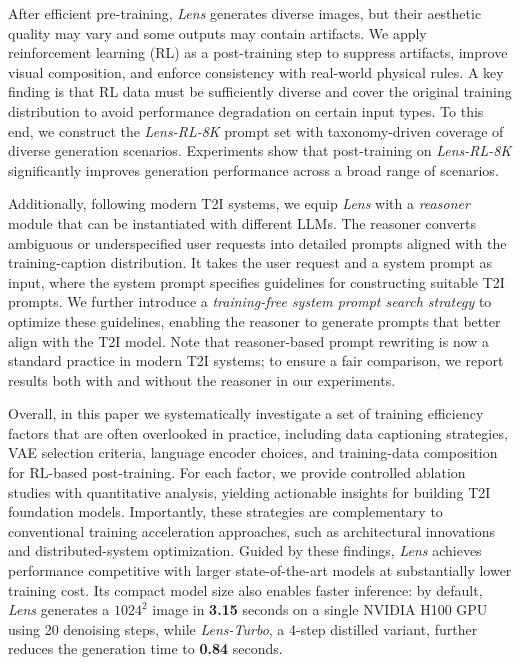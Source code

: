 After efficient pre-training, \textit{Lens} generates diverse images, but their aesthetic quality may vary and some outputs may contain artifacts. We apply reinforcement learning (RL) as a post-training step to suppress artifacts, improve visual composition, and enforce consistency with real-world physical rules. A key finding is that RL data must be sufficiently diverse and cover the original training distribution to avoid performance degradation on certain input types. To this end, we construct the \textit{Lens-RL-8K} prompt set with taxonomy-driven coverage of diverse generation scenarios. Experiments show that post-training on \textit{Lens-RL-8K} significantly improves generation performance across a broad range of scenarios.



Additionally, following modern T2I systems, we equip \textit{Lens} with a \textit{reasoner} module that can be instantiated with different LLMs. The reasoner converts ambiguous or underspecified user requests into detailed prompts aligned with the training-caption distribution. It takes the user request and a system prompt as input, where the system prompt specifies guidelines for constructing suitable T2I prompts. We further introduce a \textit{training-free system prompt search strategy} to optimize these guidelines, enabling the reasoner to generate prompts that better align with the T2I model. Note that reasoner-based prompt rewriting is now a standard practice in modern T2I systems; to ensure a fair comparison, we report results both with and without the reasoner in our experiments.

Overall, in this paper we systematically investigate a set of training efficiency factors that are often overlooked in practice, including data captioning strategies, VAE selection criteria, language encoder choices, and training-data composition for RL-based post-training. For each factor, we provide controlled ablation studies with quantitative analysis, yielding actionable insights for building T2I foundation models. Importantly, these strategies are complementary to conventional training acceleration approaches, such as architectural innovations and distributed-system optimization. Guided by these findings, \textit{Lens} achieves performance competitive with larger state-of-the-art models at substantially lower training cost. Its compact model size also enables faster inference: by default, \textit{Lens} generates a $1024^2$ image in \textbf{3.15} seconds on a single NVIDIA H100 GPU using 20 denoising steps, while \textit{Lens-Turbo}, a 4-step distilled variant, further reduces the generation time to \textbf{0.84} seconds.
